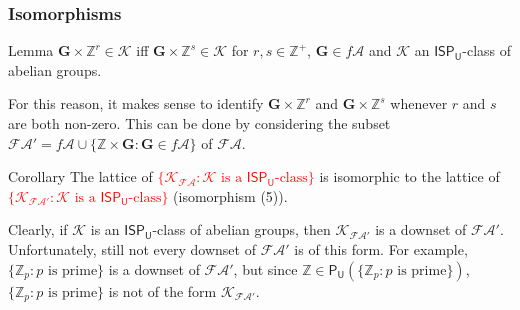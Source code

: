 \documentclass[professionalfont, handout, 10pt]{beamer} %
\theoremstyle{plain}
\theoremstyle{definition}
\newcommand{\m}[1]{{\mathbf {#1} }}
\newcommand{\bb}[1]{\mathbb {#1}}
\begin{document}
\begin{frame}
\frametitle{Isomorphisms}
    \begin{block}{Lemma}
        $\m G \times \mathbb{Z}^r \in \mathcal{K}$ iff $\m G \times \mathbb{Z}^s \in \mathcal{K}$ for $r, s \in \bb{Z}^+$, $\m G \in f\mathcal{A}$ and $\mathcal{K}$ an $\mathsf{ISP_U}$-class of abelian groups.
    \end{block}
    \pause
    For this reason, it makes sense to identify $\m G \times \mathbb{Z}^r$ and $\m G \times \mathbb{Z}^s$ whenever $r$ and $s$ are both non-zero.
    This can be done by considering the subset $\mathcal{FA}' = f\mathcal{A} \cup \{\bb{Z} \times \m G: \m G \in f\mathcal{A}\}$ of $\mathcal{FA}$.
    \pause
    \begin{block}{Corollary}
        The lattice of \textcolor{red}{$\{\mathcal{K}_{\mathcal{FA}}: \mathcal{K} \text{ is a } \mathsf{ISP_U} \text{-class}\}$} is isomorphic to the lattice of \textcolor{red}{$\{\mathcal{K}_{\mathcal{FA}'}: \mathcal{K} \text{ is a } \mathsf{ISP_U} \text{-class}\}$} (isomorphism (5)).
    \end{block}
    \pause
    Clearly, if $\mathcal{K}$ is an $\mathsf{ISP_U}$-class of abelian groups, then $\mathcal{K}_{\mathcal{FA}'}$ is a downset of $\mathcal{FA}'$.
    Unfortunately, still not every downset of $\mathcal{FA}'$ is of this form.
    For example, $\{\bb{Z}_p: p \text{ is prime}\}$ is a downset of $\mathcal{FA}'$, but since $\bb{Z} \in \mathsf{P_U}(\{\bb{Z}_p: p \text{ is prime}\})$, $\{\bb{Z}_p: p \text{ is prime}\}$ is not of the form $\mathcal{K}_{\mathcal{FA}'}$.
\end{frame}
\end{document}
